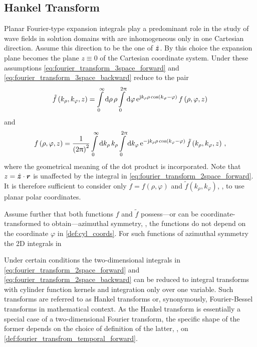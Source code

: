 \subsection{Hankel Transform}

Planar Fourier-type expansion integrals play a predominant role in the study
of wave fields in solution domains with are inhomogeneous only in one
Cartesian direction.
Assume this direction to be the one of $\uv{z}$.
By this choice the expansion plane becomes the plane $z \equiv 0$ of the
Cartesian coordinate system.
Under these assumptions \eqref{eq:fourier_transform_3space_forward}
and \eqref{eq:fourier_transform_3space_backward} reduce to the pair
\begin{equation}\label{eq:fourier_transform_2space_forward}
	\tilde{f} \left(k_\rho, k_\varphi, z\right) = 
	\int\limits_{0}^{\infty} \mathrm{d} \rho \, \rho
	\int\limits_{0}^{2\uppi} \mathrm{d} \varphi \, 
	\mathrm{e}^{\mathrm{j} k_\rho \rho \cos \left(k_\varphi - \varphi\right)}\,
	f \left(\rho, \varphi, z\right)
\end{equation}
and
\begin{equation}\label{eq:fourier_transform_2space_backward}
	f \left(\rho, \varphi, z\right) = 
	\frac{1}{\left(2\uppi\right)^2}
	\int\limits_{0}^{\infty} \mathrm{d} k_\rho \, k_\rho
	\int\limits_{0}^{2\uppi} \mathrm{d} k_\varphi \, 
	\mathrm{e}^{-\mathrm{j} k_\rho \rho \cos \left(k_\varphi - \varphi\right)}\,
	\tilde{f} \left(k_\rho, k_\varphi, z\right)
	\, ,
\end{equation}
where the geometrical meaning of the dot product is incorporated.
Note that $z = \uv{z} \cdot \pvec{r}$ is unaffected by the integral in
\eqref{eq:fourier_transform_2space_forward}.
It is therefore sufficient to consider only $f = f\left(\rho, \varphi\right)$
and $\tilde{f} \left(k_\rho, k_\varphi\right)$, \ie, to use planar polar
coordinates.

Assume further that both functions $f$ and $\tilde{f}$ possess---or
can be coordinate-transformed to obtain---azimuthal symmetry, \ie, the
functions do not depend on the coordinate $\varphi$ in \cref{def:cyl_coords}.
For such functions of azimuthal symmetry the 2D integrals in 

Under certain conditions the two-dimensional integrals in
\eqref{eq:fourier_transform_2space_forward} and 
\eqref{eq:fourier_transform_2space_backward} can be reduced to integral
transforms with cylinder function kernels and integration only over one
variable.
Such transforms are referred to as Hankel transforms or, synonymously,
Fourier-Bessel transforms in mathematical context.
As the Hankel transform is essentially a special case of a two-dimensional
Fourier transform, the specific shape of the former depends on the choice of
definition of the latter, \ie, on \cref{def:fourier_transfrom_temporal_forward}.


